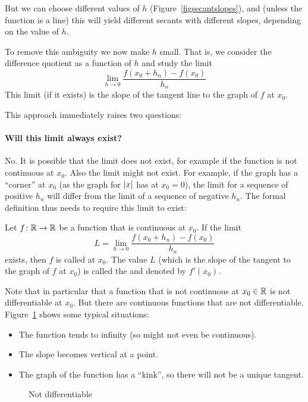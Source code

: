But we can choose different values of $h$ (Figure~\ref{figsecantslopes}),
and (unless the function is a line) this will yield different secants with
different slopes, depending on the value of $h$.

To remove this ambiguity we now make $h$ small. That is, we consider 
the difference quotient as a function of $h$ and study the limit
\[
\lim_{h\to 0}\frac{f(x_0+h_n)-f(x_0)}{h_n}
\]
This limit (if it exists) is the slope of the tangent line to the graph of
$f$ at $x_0$.
\smallskip

This approach immediately raises two questions:

\paragraph{Will this limit always exist?} No. It is possible that the limit
does not exist, for example if the function is not continuous at $x_0$. Also
the limit might not exist.
For example, if the graph
has a ``corner'' at $x_0$ (as the graph for $\left|x\right|$ has at $x_0=0$), the
limit for a sequence of positive $h_n$ will differ from the limit of a
sequence of negative $h_n$. The formal definition thus needs to require this
limit to exist:

\begin{defn}
Let $f\colon{\mathbb R}\to{\mathbb R}$ be a function that is continuous at $x_0$. If the limit
\[
L=\lim_{h\to 0}\frac{f(x_0+h_n)-f(x_0)}{h_n}
\]
exists, then
$f$ is called  at $x_0$. The value $L$ (which is the
slope of the tangent to the graph of $f$ at $x_0$) is called the
 and denoted by $f'(x_0)$.
\end{defn}
Note that in particular that a function that is not continuous at $x_0\in{\mathbb R}$ 
is not differentiable at $x_0$. But there are continuous functions that are
not differentiable. Figure~\ref{fiUndifferentiable} shows some typical situations:
\begin{itemize}
\item The function tends to infinity (so might not even be continuous).
\item The slope becomes vertical at a point.
\item The graph of the function has a ``kink'', so there will not be a
unique tangent.
\end{itemize}
\begin{figure}[t]
\begin{center}
\end{center}
\caption{Not differentiable}
\label{fiUndifferentiable}
\end{figure}

